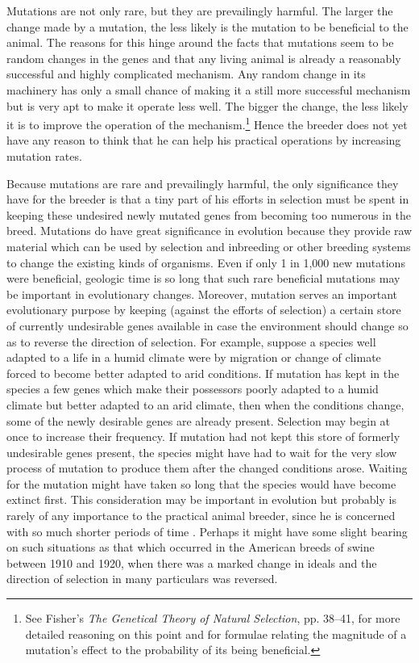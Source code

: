 Mutations are not only rare, but they are prevailingly harmful. The
larger the change made by a mutation, the less likely is the mutation to
be beneficial to the animal. The reasons for this hinge around the facts
that mutations seem to be random changes in the genes and that any
living animal is already a reasonably successful and highly complicated
mechanism. Any random change in its machinery has only a small
chance of making it a still more successful mechanism but is very apt
to make it operate less well. The bigger the change, the less likely it is
to improve the operation of the mechanism.\footnote{See Fisher's \textit{The
Genetical Theory of Natural Selection}, pp. 38--41, for more detailed reasoning
on this point and for formulae relating the magnitude of a mutation's effect to
the probability of its being beneficial.}
Hence the breeder does not yet have any reason to think that he can help his
practical operations by increasing mutation rates.

Because mutations are rare and prevailingly harmful, the only significance
they have for the breeder is that a tiny part of his efforts in
selection must be spent in keeping these undesired newly mutated
genes from becoming too numerous in the breed. Mutations do have
great significance in evolution because they provide raw material
which can be used by selection and inbreeding or other breeding systems
to change the existing kinds of organisms. Even if only 1 in 1,000
new mutations were beneficial, geologic time is so long that such rare
beneficial mutations may be important in evolutionary changes. Moreover,
mutation serves an important evolutionary purpose by keeping
(against the efforts of selection) a certain store of currently undesirable
genes available in case the environment should change so as to reverse
the direction of selection. For example, suppose a species well adapted
to a life in a humid climate were by migration or change of climate
forced to become better adapted to arid conditions. If mutation has
kept in the species a few genes which make their possessors poorly adapted
to a humid climate but better adapted to an arid climate, then
when the conditions change, some of the newly desirable genes are
already present. Selection may begin at once to increase their frequency.
If mutation had not kept this store of formerly undesirable genes present,
the species might have had to wait for the very slow process of
mutation to produce them after the changed conditions arose. Waiting
for the mutation might have taken so long that the species would have
become extinct first. This consideration may be important in evolution
but probably is rarely of any importance to the practical animal breeder,
since he is concerned with so much shorter periods of time . Perhaps
it might have some slight bearing on such situations as that which
occurred in the American breeds of swine between 1910 and 1920, when
there was a marked change in ideals and the direction of selection in
many particulars was reversed.

